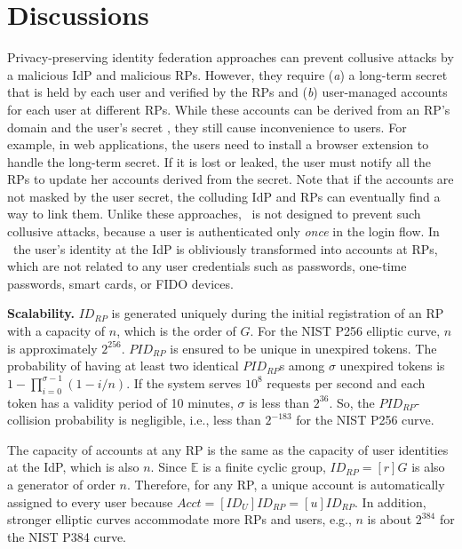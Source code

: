 \section{Discussions}
\label{sec:discussion}

Privacy-preserving identity federation approaches \cite{ELPASSO, UnlimitID, idemix, PseudoID, Opaak, uprov} can prevent collusive attacks by a malicious IdP and malicious RPs.
However, they require (\emph{a}) a long-term secret that is held by each user and verified by the RPs and (\emph{b}) user-managed accounts for each user at different RPs.
While these accounts can be derived from an RP's domain and the user's secret \cite{ELPASSO, UnlimitID, Opaak, uprov,idemix},
 they still cause inconvenience to users.
For example, in web applications, the users need to install a browser extension to handle the long-term secret.
If it is lost or leaked, the user must notify all the RPs to update her accounts derived from the secret.
Note that if the accounts are not masked by the user secret,
 the colluding IdP and RPs can eventually find a way to link them.
Unlike these approaches, \usso\ is not designed to prevent such collusive attacks,
 because a user is authenticated only \emph{once} in the login flow.
In \usso\ the user's identity at the IdP is obliviously transformed into accounts at RPs,
 which are not related to any user credentials such as passwords, one-time passwords, smart cards, or FIDO devices.

\noindent \textbf{Scalability.}
$ID_{RP}$ is generated uniquely during the initial registration of an RP with a capacity of $n$, which is the order of $G$. For the NIST P256 elliptic curve, $n$ is approximately $2^{256}$.
$PID_{RP}$ is ensured to be unique in unexpired tokens.
The probability of having at least two identical $PID_{RP}$s among $\sigma$ unexpired tokens is $1-\prod_{i=0}^{\sigma-1}(1-i/n)$.
If the system serves $10^{8}$ requests per second and each token has a validity period of 10 minutes, $\sigma$ is less than $2^{36}$. So, the $PID_{RP}$-collision probability is negligible, i.e., less than $2^{-183}$ for the NIST P256 curve.

The capacity of accounts at any RP is the same as the capacity of user identities at the IdP,
 which is also $n$.
Since $\mathbb{E}$ is a finite cyclic group, $ID_{RP} = [r]G$ is also a generator of order $n$.
Therefore, for any RP, a unique account is automatically assigned to every user because $Acct =  [ID_U]ID_{RP} = [u]ID_{RP}$.
In addition, stronger elliptic curves accommodate more RPs and users, e.g., $n$ is about $2^{384}$ for the NIST P384 curve.


